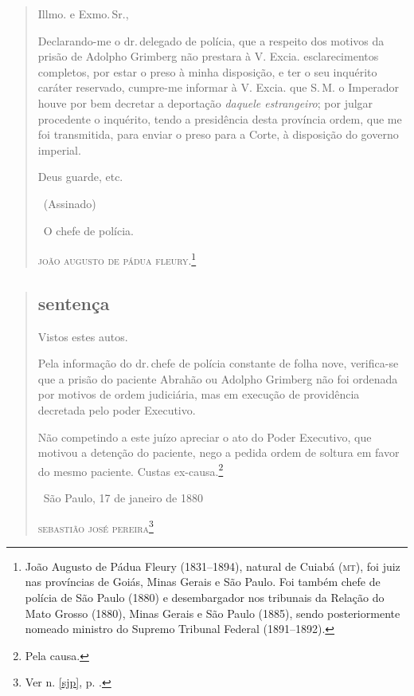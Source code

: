 \asterisc

\pagebreak
\begin{quote}
Illmo. e Exmo.\,Sr.,

Declarando-me o dr.\,delegado de polícia, que a respeito dos motivos da
prisão de Adolpho Grimberg não prestara à V. Excia. esclarecimentos
completos, por estar o preso à minha disposição, e ter o seu inquérito
caráter reservado, cumpre-me informar à V. Excia. que S.\,M. o Imperador
houve por bem decretar a deportação \emph{daquele estrangeiro}; por
julgar procedente o inquérito, tendo a presidência desta província
ordem, que me foi transmitida, para enviar o preso para a Corte, à
disposição do governo imperial.

Deus guarde, etc.\medskip

\hfill\ (Assinado)

\hfill\ O chefe de polícia.

\hfill\textsc{joão augusto de pádua fleury}.\footnote{João Augusto de Pádua Fleury
  (1831--1894), natural de Cuiabá (\textsc{mt}), foi juiz nas províncias de Goiás,
  Minas Gerais e São Paulo. Foi também chefe de polícia de São Paulo
  (1880) e desembargador nos tribunais da Relação do Mato Grosso (1880),
  Minas Gerais e São Paulo (1885), sendo posteriormente nomeado ministro
  do Supremo Tribunal Federal (1891--1892).}
\end{quote}  


\begin{quote}
\subsection{sentença}

Vistos estes autos.

Pela informação do dr.\,chefe de polícia constante de folha nove,
verifica-se que a prisão do paciente Abrahão ou Adolpho Grimberg não foi
ordenada por motivos de ordem judiciária, mas em execução de providência
decretada pelo poder Executivo.

Não competindo a este juízo apreciar o ato do Poder Executivo, que
motivou a detenção do paciente, nego a pedida ordem de soltura em favor
do mesmo paciente. Custas ex-causa.\footnote{Pela causa.}\medskip

\hfill\ São Paulo, 17 de janeiro de 1880

\hfill\textsc{sebastião josé pereira}\footnote{Ver n. \ref{sjp}, p. \pageref{sjp}.}
\end{quote}

